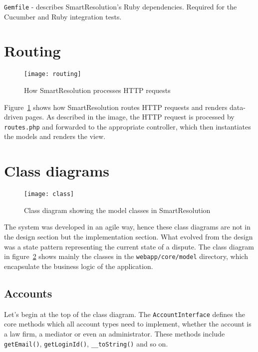 \lstinline{Gemfile} - describes SmartResolution's Ruby dependencies. Required for the Cucumber and Ruby integration tests.

\section{Routing}

\begin{figure}[h!]
  \centering
    \ifimages
    \texttt{[image: routing]}
    \fi
  \caption{How SmartResolution processes HTTP requests}
  \label{uml:routing}
\end{figure}

Figure~\ref{uml:routing} shows how SmartResolution routes HTTP requests and renders data-driven pages. As described in the image, the HTTP request is processed by \lstinline{routes.php} and forwarded to the appropriate controller, which then instantiates the models and renders the view.

\section{Class diagrams}

\begin{figure}[h!]
  \centering
    \ifimages
    \texttt{[image: class]}
    \fi
  \caption{Class diagram showing the model classes in SmartResolution}
  \label{uml:class}
\end{figure}

The system was developed in an agile way, hence these class diagrams are not in the design section but the implementation section. What evolved from the design was a state pattern representing the current state of a dispute. The class diagram in figure~\ref{uml:class} shows mainly the classes in the \lstinline{webapp/core/model} directory, which encapsulate the business logic of the application.

\subsection{Accounts}

Let's begin at the top of the class diagram. The \lstinline{AccountInterface} defines the core methods which all account types need to implement, whether the account is a law firm, a mediator or even an administrator. These methods include \lstinline{getEmail()}, \lstinline{getLoginId()}, \lstinline{__toString()} and so on.

